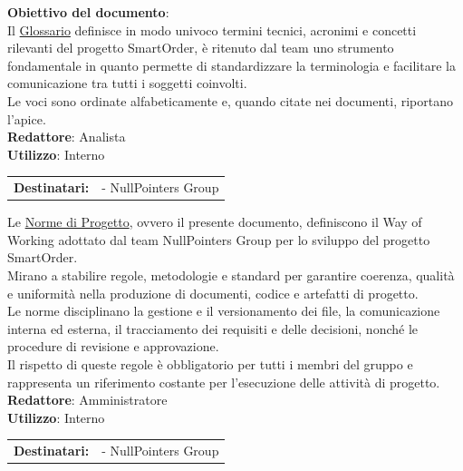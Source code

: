 	\textbf{Obiettivo del documento}:\\
	Il \href{https://nullpointersgroup.github.io/Documentazione/output/RTB/Documenti%20Interni/Glossario.pdf}{Glossario} 
	definisce in modo univoco termini tecnici, acronimi e concetti rilevanti del progetto SmartOrder, è ritenuto dal team uno strumento fondamentale in quanto permette di standardizzare la terminologia e facilitare la comunicazione tra tutti i soggetti coinvolti.\\
	Le voci sono ordinate alfabeticamente e, quando citate nei documenti, riportano l'apice.\\[0.5em]
	\medskip
	\textbf{Redattore}: Analista\\
	\medskip
	\textbf{Utilizzo}: Interno\\
	\medskip 
	\begin{tabular}{@{}l l}
		\textbf{Destinatari:} & - NullPointers Group
	\end{tabular}

	Le \href{https://nullpointersgroup.github.io/Documentazione/output/RTB/Documenti%20Interni/Norme_di_Progetto.pdf}{Norme di Progetto}, ovvero il presente documento, definiscono il Way of Working adottato dal team NullPointers Group per lo sviluppo del progetto SmartOrder.\\
	Mirano a stabilire regole, metodologie e standard per garantire coerenza, qualità e uniformità nella produzione di documenti, codice e artefatti di progetto.\\
	Le norme disciplinano la gestione e il versionamento dei file, la comunicazione interna ed esterna, il tracciamento dei requisiti e delle decisioni, nonché le procedure di revisione e approvazione.\\ 
	Il rispetto di queste regole è obbligatorio per tutti i membri del gruppo e rappresenta un riferimento costante per l’esecuzione delle attività di progetto.\\[0.5em]
	\medskip
	\textbf{Redattore}: Amministratore\\
	\medskip
	\textbf{Utilizzo}: Interno\\
	\medskip 
	\begin{tabular}{@{}l l}
		\textbf{Destinatari:} & - NullPointers Group
	\end{tabular}


